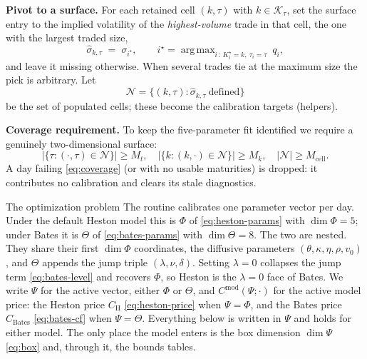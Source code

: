 \documentclass[a4paper, 11pt, reqno]{amsart}
\makeatletter
\def\section{\@startsection{section}{1}%
  \z@{.7\linespacing\@plus\linespacing}{.5\linespacing}%
  {\normalfont\bfseries\centering}}
\DeclareMathOperator*{\argmax}{arg\,max}
\makeatother
\begin{document}
		\textbf{Pivot to a surface.} For each retained cell $(k,\tau)$ with $k\in\mathcal{K}_\tau$,
		set the surface entry to the implied volatility of the \emph{highest-volume} trade in that
		cell, the one with the largest traded size,
		\begin{equation}\label{eq:pivot}
			\hat\sigma_{k,\tau} \;=\; \sigma_{i^\star}, \qquad
			i^\star = \argmax_{i\,:\,K^\star_i=k,\ \tau_i=\tau}\ q_i ,
		\end{equation}
		and leave it missing otherwise. When several trades tie at the maximum size the pick is
		arbitrary. Let
		\begin{equation}
			\mathcal{N} = \bigl\{(k,\tau) : \hat\sigma_{k,\tau}\ \text{defined}\bigr\}
		\end{equation}
		be the set of populated cells; these become the calibration targets (helpers).
	
		\textbf{Coverage requirement.} To keep the five-parameter fit identified we require a
		genuinely two-dimensional surface:
		\begin{equation}\label{eq:coverage}
			\bigl|\{\tau : (\cdot,\tau)\in\mathcal{N}\}\bigr| \ge M_t,
			\quad
			\bigl|\{k : (k,\cdot)\in\mathcal{N}\}\bigr| \ge M_k,
			\quad
			|\mathcal{N}| \ge M_{\mathrm{cell}} .
		\end{equation}
		A day failing \eqref{eq:coverage} (or with no usable maturities) is dropped: it
		contributes no calibration and clears its stale diagnostics.

	\section{The optimization problem}\label{sec:objective}
		The routine calibrates one parameter vector per day. Under the default Heston model this is $\Phi$
		of \eqref{eq:heston-params} with $\dim\Phi=5$; under Bates it is $\Theta$ of \eqref{eq:bates-params} with
		$\dim\Theta=8$. The two are nested. They share their first $\dim\Phi$ coordinates, the diffusive
		parameters $(\theta,\kappa,\eta,\rho,v_0)$, and $\Theta$ appends the jump triple
		$(\lambda,\nu,\delta)$. Setting $\lambda=0$ collapses the jump term \eqref{eq:bates-level} and
		recovers $\Phi$, so Heston is the $\lambda=0$ face of Bates. We write $\Psi$ for the active vector,
		either $\Phi$ or $\Theta$, and $C^{\mathrm{mod}}(\Psi;\cdot)$ for the active model price: the Heston
		price $C_{\mathrm{H}}$ \eqref{eq:heston-price} when $\Psi=\Phi$, and the Bates price
		$C_{\mathrm{Bates}}$ \eqref{eq:bates-cf} when $\Psi=\Theta$. Everything below is written in $\Psi$
		and holds for either model. The only place the model enters is the box dimension $\dim\Psi$
		\eqref{eq:box} and, through it, the bounds tables.
	
\end{document}
